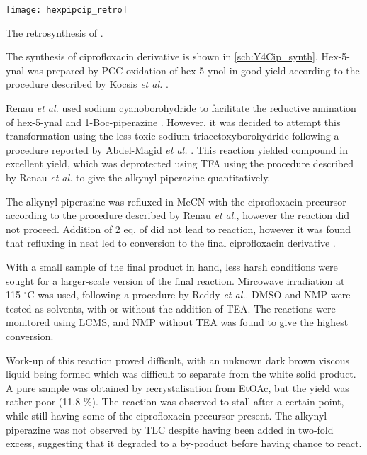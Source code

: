 \begin{scheme}[H]
	\begin{center}
		\texttt{[image: hexpipcip\_retro]}
		\caption{The retrosynthesis of . \label{sch:Y4Cip_retro}}
	\end{center}
\end{scheme}


The synthesis of ciprofloxacin derivative  is shown in \ref{sch:Y4Cip_synth}. Hex-5-ynal  was prepared by PCC oxidation of hex-5-ynol  in good yield according to the procedure described by Kocsis \textit{et al.} \cite{Kocsis2012}. 

Renau \textit{et al.}\cite{Renau1996} used sodium cyanoborohydride to facilitate the reductive amination of hex-5-ynal  and 1-Boc-piperazine . However, it was decided to attempt this transformation using the less toxic sodium triacetoxyborohydride following a procedure reported by Abdel-Magid \textit{et al.} \cite{Abdel-Magid1996}. This reaction yielded compound  in excellent yield, which was deprotected using TFA using the procedure described by Renau \textit{et al.}\cite{Renau1996} to give the alkynyl piperazine  quantitatively. 

The alkynyl piperazine  was refluxed in MeCN with the ciprofloxacin precursor  according to the procedure described by Renau \textit{et al.}\cite{Renau1996}, however the reaction did not proceed. Addition of 2 eq. of  did not lead to reaction, however it was found that refluxing in neat  led to conversion to the final ciprofloxacin derivative .

With a small sample of the final product in hand, less harsh conditions were sought for a larger-scale version of the final reaction. Mircowave irradiation at 115 $^{\circ}$C was used, following a procedure by Reddy \textit{et al.}\cite{Reddy2001}. DMSO and NMP were tested as solvents, with or without the addition of TEA. The reactions were monitored using LCMS, and NMP without TEA was found to give the highest conversion. 

Work-up of this reaction proved difficult, with an unknown dark brown viscous liquid being formed which was difficult to separate from the white solid product. A pure sample was obtained by recrystalisation from EtOAc, but the yield was rather poor (11.8 \%). The reaction was observed to stall after a certain point, while still having some of the ciprofloxacin precursor  present. The alkynyl piperazine  was not observed by TLC despite having been added in two-fold excess, suggesting that it degraded to a by-product before having chance to react. 

